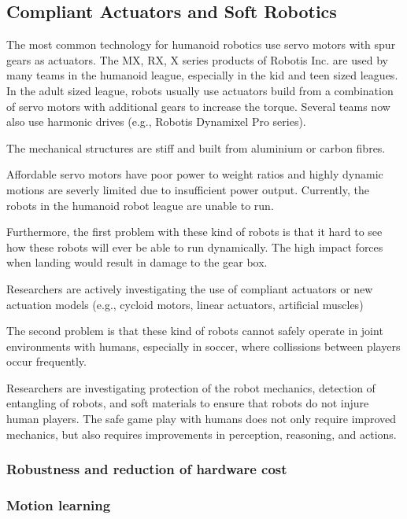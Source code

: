 \documentclass{article}
\begin{document}
\subsection{Compliant Actuators and Soft Robotics}

The most common technology for humanoid robotics use servo motors with spur gears as actuators.
The MX, RX, X series products of Robotis Inc. are used by many teams in the humanoid league, especially in the kid and teen sized leagues.
In the adult sized league, robots usually use actuators build from a combination of servo motors with additional gears to increase the torque.
Several teams now also use harmonic drives (e.g., Robotis Dynamixel Pro series).

The mechanical structures are stiff and built from aluminium or carbon fibres.

Affordable servo motors have poor power to weight ratios and highly dynamic motions are severly limited due to insufficient power output.
Currently, the robots in the humanoid robot league are unable to run.

Furthermore, the first problem with these kind of robots is that it hard to see how these robots will ever be able to run dynamically.
The high impact forces when landing would result in damage to the gear box.

Researchers are actively investigating the use of compliant actuators or new actuation models (e.g., cycloid motors, linear actuators, artificial muscles)

The second problem is that these kind of robots cannot safely operate in joint environments with humans, especially in soccer, where collissions between players occur frequently.

Researchers are investigating protection of the robot mechanics, detection of entangling of robots, and soft materials to ensure that robots do not injure human players.
The safe game play with humans does not only require improved mechanics, but also requires improvements in perception, reasoning, and actions.

\subsubsection{Robustness and reduction of hardware cost}

\subsubsection{Motion learning}
\end{document}
